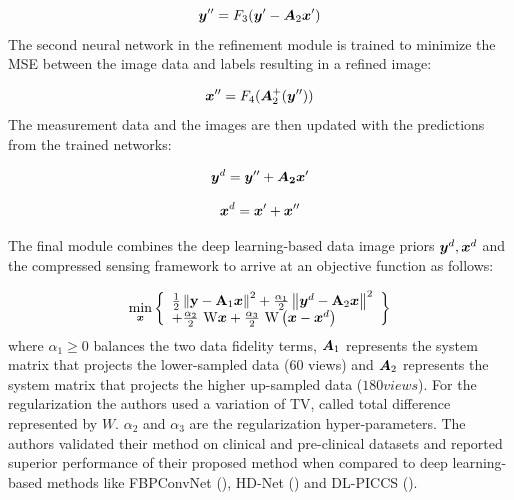 \begin{itemize}
\begin{equation}
	\bm{y}'' = F_3(\bm{y}'-\bm{A}_{2} \bm{x}')
\end{equation} 
The second neural network in the refinement module is trained to minimize the \ac{MSE} between the image data and labels resulting in a refined image:

\begin{equation}
\bm{x}'' = F_4(\bm{A}_{2}^{+}(\bm{y}''))
\end{equation} 
The measurement data and the images are then updated with the predictions from the trained networks:

\begin{equation}
	\bm{y}^d = \bm{y}'' + \bm{A_{2}} \bm{x}' 
\end{equation}

\begin{equation}
    \bm{x}^d = \bm{x}' + \bm{x}''
\end{equation}

\end{itemize}

The final module combines the deep learning-based data image priors ${\bm{y}^d,\bm{x}^d}$ and the compressed sensing framework to arrive at an objective function as follows:

\begin{equation}\label{eq:cs}
\min _{\bm{x}}\left\{\begin{array}{l}
\frac{1}{2}\left\|\mathbf{y}-\mathbf{A}_{1} \bm{x} \right\|^{2}+\frac{\alpha_{1}}{2}\left\|\bm{y}^{d}-\mathbf{A}_{2} \bm{x}\right\|^{2} \\
+\frac{\alpha_{2}}{2} \mathrm{~W} \bm{x}+\frac{\alpha_{3}}{2} \mathrm{~W}\left(\bm{x}-\bm{x}^{d}\right)
\end{array}\right\}
\end{equation}
where $\alpha_{1} \ge 0$ balances the two data fidelity terms, $\bm{A}_{1}$ represents the system matrix that projects the lower-sampled data (60 views) and $\bm{A}_{2}$ represents the system matrix that projects the higher up-sampled data ($180 views$). For the regularization the authors used a variation of TV, called total difference represented by $W$. $\alpha_{2}$ and $\alpha_{3}$ are the regularization hyper-parameters. The authors validated their method on clinical and pre-clinical datasets and reported superior performance of their proposed method when compared to deep learning-based methods like FBPConvNet (\cite{jin2017deep}), HD-Net (\cite{wu2020high}) and DL-PICCS (\cite{zhang2020deep}).
 
